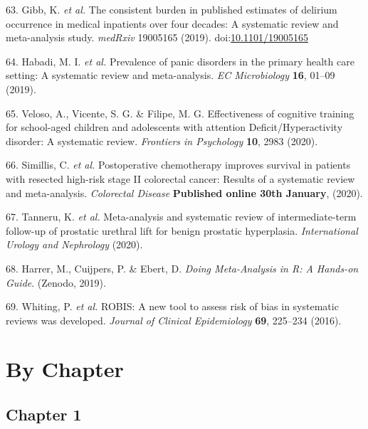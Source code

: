 \documentclass[a4paper, twoside]{templates/ociamthesis}
\begin{document}
\leavevmode\hypertarget{ref-gibb2019consistent}{}%
63. Gibb, K. \emph{et al.} The consistent burden in published estimates of delirium occurrence in medical inpatients over four decades: A systematic review and meta-analysis study. \emph{medRxiv} 19005165 (2019). doi:\href{https://doi.org/10.1101/19005165}{10.1101/19005165}

\leavevmode\hypertarget{ref-habadi2019prevalence}{}%
64. Habadi, M. I. \emph{et al.} Prevalence of panic disorders in the primary health care setting: A systematic review and meta-analysis. \emph{EC Microbiology} \textbf{16}, 01--09 (2019).

\leavevmode\hypertarget{ref-veloso2020effectiveness}{}%
65. Veloso, A., Vicente, S. G. \& Filipe, M. G. Effectiveness of cognitive training for school-aged children and adolescents with attention Deficit/Hyperactivity disorder: A systematic review. \emph{Frontiers in Psychology} \textbf{10}, 2983 (2020).

\leavevmode\hypertarget{ref-simillis2020}{}%
66. Simillis, C. \emph{et al.} Postoperative chemotherapy improves survival in patients with resected high-risk stage II colorectal cancer: Results of a systematic review and meta-analysis. \emph{Colorectal Disease} \textbf{Published online 30th January}, (2020).

\leavevmode\hypertarget{ref-tanneru2020}{}%
67. Tanneru, K. \emph{et al.} Meta-analysis and systematic review of intermediate-term follow-up of prostatic urethral lift for benign prostatic hyperplasia. \emph{International Urology and Nephrology} (2020).

\leavevmode\hypertarget{ref-mathias_harrer_2019_2551803}{}%
68. Harrer, M., Cuijpers, P. \& Ebert, D. \emph{Doing Meta-Analysis in R: A Hands-on Guide}. (Zenodo, 2019).

\leavevmode\hypertarget{ref-whiting2016robis}{}%
69. Whiting, P. \emph{et al.} ROBIS: A new tool to assess risk of bias in systematic reviews was developed. \emph{Journal of Clinical Epidemiology} \textbf{69}, 225--234 (2016).

\startappendices

\hypertarget{by-chapter}{%
\chapter{By Chapter}\label{by-chapter}}

\hypertarget{chapter-1}{%
\section{Chapter 1}\label{chapter-1}}
\end{document}
